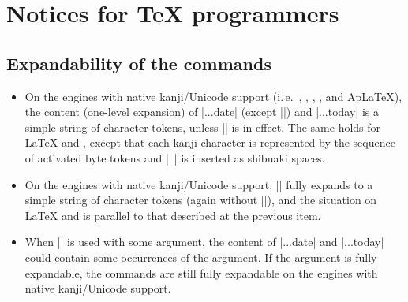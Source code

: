 \documentclass[a4paper]{article}
\newcommand{\Ie}{i.\,e.}
\newcommand*{\+}{\hspace{0.25em minus 0.25em}}
\begin{document}
\section{Notices for {\TeX} programmers}
\label{sec:Allez}

\subsection{Expandability of the commands}

\begin{itemize}
\item On the engines with native kanji/Unicode support
  (\Ie~{\LuaLaTeX}, {\XeLaTeX}, {\pLaTeX}, {\upLaTeX}, and {Ap\LaTeX}),
  the content (one-level expansion) of |\wareki...date|
  (except |\warekicustomdate|) and |\wareki...today|
  is a simple string of character tokens,
  unless |\WarekiUseCustomInterGlue| is in effect.
  The same holds for {\LaTeX} and {\pdfLaTeX},
  except that each kanji character is
  represented by the sequence of activated byte tokens
  and |~| is inserted as shibuaki spaces.
\item On the engines with native kanji/Unicode support,
  |\warekicustomdate| fully expands to a simple string
  of character tokens
  (again without |\WarekiUseCustomInterGlue|),
  and the situation on {\LaTeX} and {\pdfLaTeX}
  is parallel to that described at the previous item.
\item When |\WarekiUseCustomInterGlue| is used with some argument,
  the content of |\wareki...date| and |\wareki...today|
  could contain some occurrences of the argument.
  If the argument is fully expandable,
  the commands are still fully expandable
  on the engines with native kanji/Unicode support.
\end{itemize}

\end{document}
